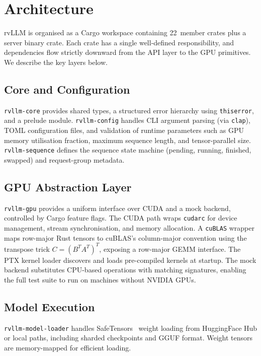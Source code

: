 \documentclass[11pt,a4paper]{article}
\begin{document}
\section{Architecture}
\label{sec:architecture}

rvLLM is organised as a Cargo workspace containing 22~member crates plus a server
binary crate. Each crate has a single well-defined responsibility, and dependencies
flow strictly downward from the API layer to the GPU primitives. We describe the key
layers below.

\subsection{Core and Configuration}

\texttt{rvllm-core} provides shared types, a structured error hierarchy using
\texttt{thiserror}, and a prelude module. \texttt{rvllm-config} handles CLI argument
parsing (via \texttt{clap}), TOML configuration files, and validation of runtime
parameters such as GPU memory utilisation fraction, maximum sequence length, and
tensor-parallel size. \texttt{rvllm-sequence} defines the sequence state machine
(pending, running, finished, swapped) and request-group metadata.

\subsection{GPU Abstraction Layer}

\texttt{rvllm-gpu} provides a uniform interface over CUDA and a mock backend,
controlled by Cargo feature flags. The CUDA path wraps \texttt{cudarc} for device
management, stream synchronisation, and memory allocation. A \texttt{cuBLAS} wrapper
maps row-major Rust tensors to cuBLAS's column-major convention using the transpose
trick $C = (B^T A^T)^T$, exposing a row-major GEMM interface. The PTX kernel loader
discovers and loads pre-compiled kernels at startup. The mock backend substitutes
CPU-based operations with matching signatures, enabling the full test suite to run on
machines without NVIDIA GPUs.

\subsection{Model Execution}

\texttt{rvllm-model-loader} handles SafeTensors~\cite{safetensors2023} weight loading
from HuggingFace Hub or local paths, including sharded checkpoints and GGUF format.
Weight tensors are memory-mapped for efficient loading.
\end{document}
